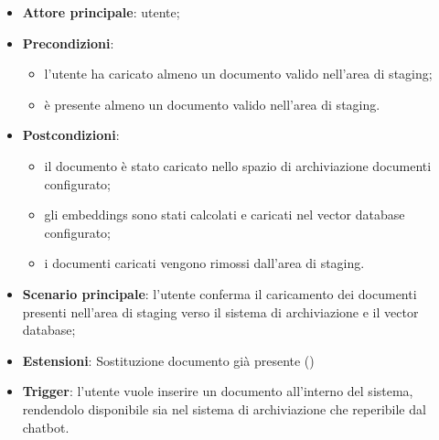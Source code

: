 \documentclass[10pt, a4paper]{article}
\begin{document}
    \begin{itemize}
        \item \textbf{Attore principale}: utente;
        \item \textbf{Precondizioni}:
            \begin{itemize}
                \item l’utente ha caricato almeno un documento valido nell’area di staging;
                \item è presente almeno un documento valido nell’area di staging.
            \end{itemize}
        \item \textbf{Postcondizioni}:
        \begin{itemize}
            \item il documento è stato caricato nello spazio di archiviazione documenti configurato;
            \item gli embeddings sono stati calcolati e caricati nel vector database configurato;
            \item i documenti caricati vengono rimossi dall’area di staging.
        \end{itemize}
        \item \textbf{Scenario principale}: l’utente conferma il caricamento dei documenti presenti nell’area di staging verso il sistema di archiviazione e il vector database;
        \item \textbf{Estensioni}: Sostituzione documento già presente ()
        \item \textbf{Trigger}: l’utente vuole inserire un documento all’interno del sistema, rendendolo disponibile sia nel sistema di archiviazione che reperibile dal chatbot.
    \end{itemize}

\end{document}
